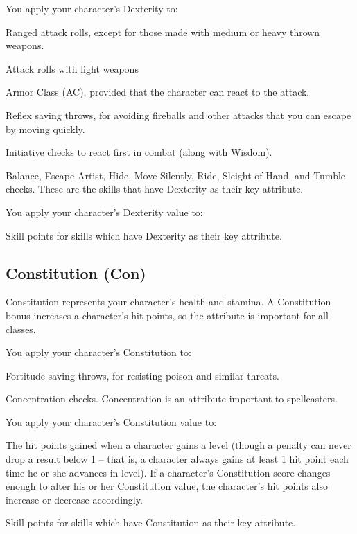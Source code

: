 You apply your character's Dexterity to:
\begin{itemize*}
\item Ranged attack rolls, except for those made with medium or heavy thrown weapons.
\item Attack rolls with light weapons
\item Armor Class (AC), provided that the character can react to the attack.
\item Reflex saving throws, for avoiding fireballs and other attacks that you can escape by moving quickly.
\item Initiative checks to react first in combat (along with Wisdom).
 \item Balance, Escape Artist, Hide, Move Silently, Ride, Sleight of Hand, and Tumble checks.  These are the skills that have Dexterity as their key attribute.
\end{itemize*}
You apply your character's Dexterity value to:
\begin{itemize*}
\item Skill points for skills which have Dexterity as their key attribute.
\end{itemize*}

\subsection{Constitution (Con)}
Constitution represents your character's health and stamina. A Constitution bonus increases a character's hit points, so the attribute is important for all classes.

You apply your character's Constitution to:
\begin{itemize*}
\item Fortitude saving throws, for resisting poison and similar threats.
\item Concentration checks. Concentration is an attribute important to spellcasters.
\end{itemize*}

\par You apply your character's Constitution value to:
\begin{itemize*}
\item The hit points gained when a character gains a level (though a penalty can never drop a result below 1 -- that is, a character always gains at least 1 hit point each time he or she advances in level). If a character's Constitution score changes enough to alter his or her Constitution value, the character's hit points also increase or decrease accordingly.
\item Skill points for skills which have Constitution as their key attribute.
\end{itemize*}

